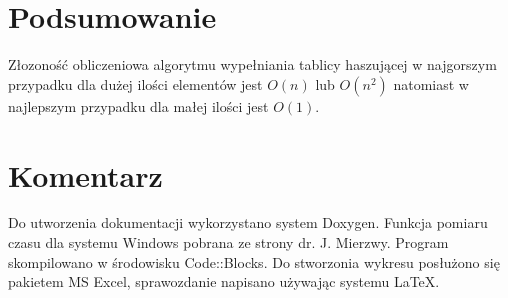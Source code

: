 \documentclass[twoside]{article}
\newcommand{\+}{\discretionary{\mbox{\scriptsize$\hookleftarrow$}}{}{}}
\begin{document}
\section{Podsumowanie}
Złozoność obliczeniowa algorytmu wypełniania tablicy haszującej w najgorszym przypadku dla dużej ilości elementów jest $O(n)$ lub $O(n^{2})$ natomiast w najlepszym przypadku dla małej ilości jest $O(1)$.
\section{Komentarz}
Do utworzenia dokumentacji wykorzystano system Doxygen.
Funkcja pomiaru czasu dla systemu Windows pobrana ze strony dr. J. Mierzwy. Program skompilowano w środowisku Code::Blocks. Do stworzonia wykresu posłużono się pakietem MS Excel, sprawozdanie napisano używając systemu \LaTeX.
\end{document}
